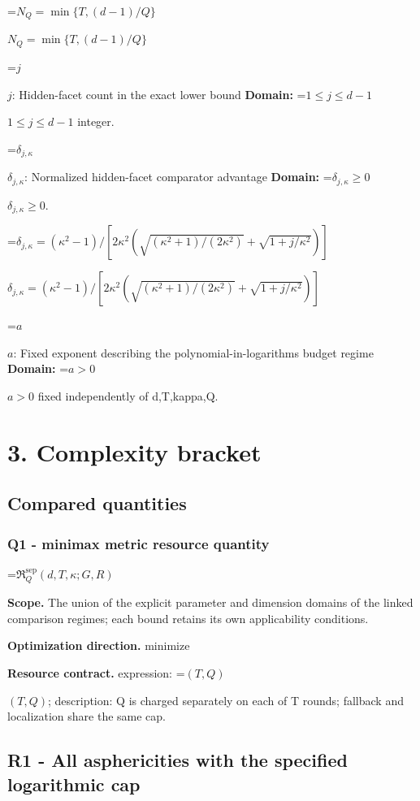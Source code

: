 \documentclass[10pt,a4paper]{article}
\newcommand{\AtlasMath}[1]{\par\begingroup\centering\setbox0=\hbox{$\displaystyle #1$}\ifdim\wd0>1.4\linewidth\typeout{ATLAS WIDE FORMULA: \the\wd0}\fi\ifdim\wd0>\linewidth\resizebox{\linewidth}{!}{\box0}\else\box0\fi\par\endgroup}
\newcommand{\AtlasInlineMath}[1]{\begingroup\setbox0=\hbox{$#1$}\ifdim\wd0>.4\linewidth\endgroup\AtlasMath{#1}\else\endgroup$#1$\fi}
\begin{document}
\AtlasInlineMath{N_Q=\min\{T,(d-1)/Q\}}



\AtlasInlineMath{j}: Hidden-facet count in the exact lower bound \textbf{Domain:} \AtlasInlineMath{1\le j\le d-1} integer.



\AtlasInlineMath{\delta_{j,\kappa}}: Normalized hidden-facet comparator advantage \textbf{Domain:} \AtlasInlineMath{\delta_{j,\kappa}\ge0}.



\AtlasInlineMath{\delta_{j,\kappa}=(\kappa^2-1)/[2\kappa^2(\sqrt{(\kappa^2+1)/(2\kappa^2)}+\sqrt{1+j/\kappa^2})]}



\AtlasInlineMath{a}: Fixed exponent describing the polynomial-in-logarithms budget regime \textbf{Domain:} \AtlasInlineMath{a>0} fixed independently of d,T,kappa,Q.



\section{3. Complexity bracket}


\subsection{Compared quantities}


\subsubsection{Q1 - minimax metric resource quantity}


\AtlasMath{\mathfrak R_Q^{\mathrm{sep}}(d,T,\kappa;G,R)}


\textbf{Scope.} The union of the explicit parameter and dimension domains of the linked comparison regimes; each bound retains its own applicability conditions.



\textbf{Optimization direction.} minimize



\textbf{Resource contract.} expression: \AtlasInlineMath{(T,Q)}; description: Q is charged separately on each of T rounds; fallback and localization share the same cap.



\subsection{R1 - All asphericities with the specified logarithmic cap}
\end{document}

